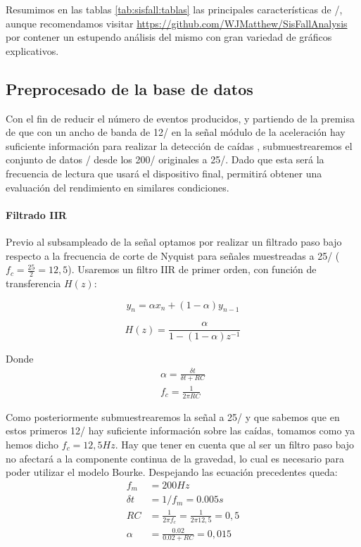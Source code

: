 Resumimos en las tablas \ref{tab:sisfall:tablas} las principales características de \sisfall/, aunque recomendamos visitar \url{https://github.com/WJMatthew/SisFallAnalysis} por contener un estupendo análisis del mismo con gran variedad de gráficos explicativos.

\subsection{Preprocesado de la base de datos}

Con el fin de reducir el número de eventos producidos, y partiendo de la premisa de que con un ancho de banda de 12\hz/ en la señal módulo de la aceleración hay suficiente información para realizar la detección de caídas \cite{Liu2018}, submuestrearemos el conjunto de datos \sisfall/ desde los 200\hz/ originales a 25\hz/. Dado que esta será la frecuencia de lectura que usará el dispositivo final, permitirá obtener una evaluación del rendimiento en similares condiciones.

\paragraph{Filtrado IIR}

Previo al subsampleado de la señal optamos por realizar un filtrado paso bajo respecto a la frecuencia de corte de Nyquist para señales muestreadas a 25\hz/ ($f_c=\frac{25}{2}=12,5$). Usaremos un filtro IIR de primer orden, con función de transferencia $H(z)$:

\[
  y_n = \alpha x_n + (1-\alpha) y_{n-1}
\]


\[
  H(z) = \frac{\alpha}{1-(1-\alpha)z^{-1}}
\]

Donde
\begin{align*}
\alpha = \frac{\delta t}{\delta t + RC} \\
f_c= \frac{1}{2 \pi RC}
\end{align*}

Como posteriormente submuestrearemos la señal a 25\hz/ y que sabemos que en estos primeros 12\hz/ hay suficiente información sobre las caídas, tomamos como ya hemos dicho $f_c=12,5Hz$. Hay que tener en cuenta que al ser un filtro paso bajo no afectará a la componente continua de la gravedad, lo cual es necesario para poder utilizar el modelo Bourke. Despejando las ecuación precedentes queda:
\begin{align*}
  f_m & = 200{Hz}\\
  \delta t & = 1/f_m = 0.005s\\
  RC & =\frac{1}{2\pi f_c} = \frac{1}{2\pi12,5} = 0,5\\
  \alpha & = \frac{0.02}{0.02 + RC} = 0,015
\end{align*}


